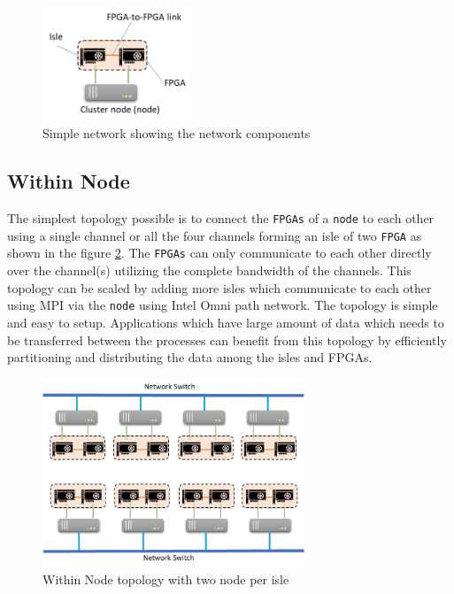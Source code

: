 \begin{figure}[h]%
    \centering
    \includegraphics[width=0.4\textwidth]{images/simple_network}
    \caption{Simple network showing the network components}
    \label{fig:simple_network}
\end{figure}


\subsection{Within Node}
\label{sec:within_node}

The simplest topology possible is to connect the \texttt{FPGAs} of a \texttt{node} to each other
using a single channel or all the four channels forming an isle of two \texttt{FPGA} as
shown in the figure \ref{fig:within_node}. The \texttt{FPGAs} can only communicate to
each other directly over the channel(s) utilizing the complete bandwidth of the
channels. This topology can be scaled by adding more isles which communicate
to each other using MPI via the \texttt{node} using Intel Omni path network. The topology
is simple and easy to setup. Applications which have large amount of data which
needs to be transferred between the processes can benefit from this topology by
efficiently partitioning and distributing the data among the isles and FPGAs.

\begin{figure}[h]%
    \centering
    \includegraphics[width=0.7\textwidth]{images/within_node}
    \caption{Within Node topology with two node per isle}
    \label{fig:within_node}
\end{figure}

